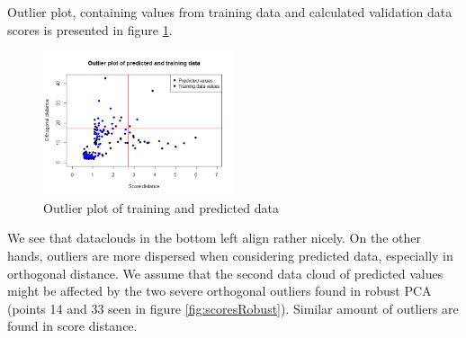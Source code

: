 \documentclass[12pt]{article}
\begin{document}
Outlier plot, containing values from training data and calculated validation data scores is presented in figure \ref{fig:outlierPred}.
\begin{figure}[h!]
  \begin{center}
    \centering
    \includegraphics[width=0.5\textwidth]{../images/outlierPred.png}
    \caption{Outlier plot of training and predicted data}
    \label{fig:outlierPred}
  \end{center}
\end{figure}

We see that dataclouds in the bottom left align rather nicely. On the other hands, outliers are more dispersed when 
considering predicted data, especially in orthogonal distance. We assume that the second data cloud of predicted values might 
be affected by the two severe orthogonal outliers found in robust PCA (points 14 and 33 seen in figure \ref{fig:scoresRobust}). 
Similar amount of outliers are found in score distance.
\end{document}
